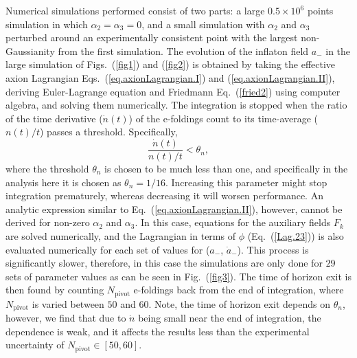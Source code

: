 \documentclass[a4paper,11pt]{article}
\begin{document}
Numerical simulations performed consist of two parts: a large $0.5 \times 10^6$ points simulation in which $\alpha_2 = \alpha_3 = 0$, and a small simulation with $\alpha_2$ and $\alpha_3$ perturbed around an experimentally consistent point with the largest non-Gaussianity from the first simulation.
  The evolution of the inflaton field $a_-$ in the large simulation of Figs.~(\ref{fig1}) and (\ref{fig2}) is obtained by taking the effective axion Lagrangian Eqs.~(\ref{eq.axionLagrangian.I}) and (\ref{eq.axionLagrangian.II}), deriving Euler-Lagrange equation and Friedmann Eq.~(\ref{fried2}) using computer algebra, and solving them numerically. The integration is stopped when the ratio of the time derivative ($\dot n\left(t\right)$) of the e-foldings count to its time-average ($n\left(t\right) / t$) passes a threshold. Specifically,
  \begin{equation} 
  	\frac{\dot n \left(t\right)}{n\left(t\right) / t} < \theta_n,
  \end{equation} 
  where the threshold $\theta_n$ is chosen to be much less than one, and specifically
   in the analysis here it is chosen as $\theta_n = 1 / 16$. Increasing this parameter might stop integration prematurely, whereas decreasing it will worsen performance.
  An analytic expression similar to Eq.~(\ref{eq.axionLagrangian.II}), however,  cannot be derived  for  non-zero $\alpha_2$ and $\alpha_3$. In this case,  equations for the auxiliary fields $F_k$ are  solved numerically,  and the Lagrangian in terms of $\phi$ (Eq.~(\ref{Lag.23})) is
  also evaluated numerically for each set of values for ($a_-$, $\dot a_-$).  
   This process is significantly slower, therefore, in this case the simulations are only done for $29$ sets of parameter values as can be seen in Fig.~(\ref{fig3}). 
    The time of horizon exit is then found by counting $N_\text{pivot}$ e-foldings back from the end of integration, where $N_\text{pivot}$ is varied between $50$ and $60$. Note, the time of horizon exit depends on $\theta_n$, however, we find that due to $\dot n$ being small near the end of integration, the dependence is weak, and it affects the results less than the experimental uncertainty of $N_\text{pivot} \in \left[50, 60\right]$.{}
\end{document}
